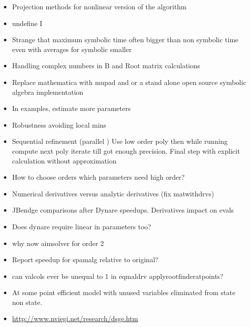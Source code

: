 \documentclass[12pt]{elsart}
\begin{document}
\begin{itemize}
\item Projection methods for nonlinear version of the algorithm
\item undefine I
\item Strange that maximum symbolic time often bigger than non symbolic time even with averages for symbolic smaller
\item Handling complex numbers in B and Root matrix calculations
\item Replace mathematica with mupad and or a stand alone open source symbolic algebra implementation
\item In examples, estimate more parameters
\item Robustness avoiding local mins
\item Sequential refinement (parallel )  Use low order poly then while running compute next poly iterate till got enough precision. Final step with explicit calculation without approximation
\item How to choose orders which parameters need high order?
\item Numerical derivatives versus analytic derivatives (fix matwithdrvs)
\item JBendge comparisons after Dynare speedups. Derivatives impact on evals
\item Does dynare require linear in parameters too?
\item why now aimsolver for order 2
\item Report speedup for spamalg relative to original?
\item can valcols ever be unequal to 1 in eqmaldrv applyrootfinderatpoints?
\item At some point efficient model with unused variables eliminated from state non state.
\item \href{Nicola Viegi}{http://www.nviegi.net/research/dsge.htm}
\end{itemize}





\newpage
\appendix
\end{document}
